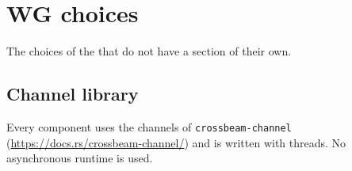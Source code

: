 \documentclass{article}
\begin{document}
\newpage
\section{WG choices}
\label{proto:wgchoices}

The choices of the \WG{} that do not have a section of their own.

\subsection{Channel library}
\label{proto:channels}

Every component uses the channels of \texttt{crossbeam-channel}
(\url{https://docs.rs/crossbeam-channel/}) and is written with threads. No asynchronous runtime
is used.
\end{document}
